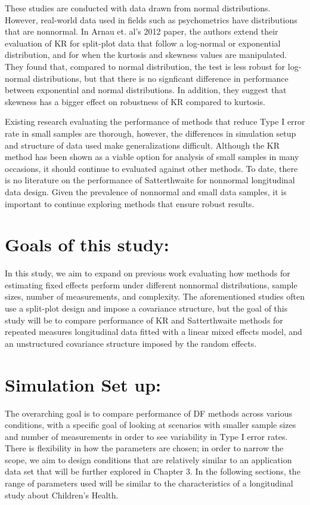 \documentclass[12pt, twoside]{amherstthesis}
\begin{document}
These studies are conducted with data drawn from normal distributions. However, real-world data used in fields such as psychometrics have distributions that are nonnormal. In Arnau et. al's 2012 paper, the authors extend their evaluation of KR for split-plot data that follow a log-normal or exponential distribution, and for when the kurtosis and skewness values are manipulated. They found that, compared to normal distribution, the test is less robust for log-normal distributions, but that there is no signficant difference in performance between exponential and normal distributions. In addition, they suggest that skewness has a bigger effect on robustness of KR compared to kurtosis.

Existing research evaluating the performance of methods that reduce Type I error rate in small samples are thorough, however, the differences in simulation setup and structure of data used make generalizations difficult. Although the KR method has been shown as a viable option for analysis of small samples in many occasions, it should continue to evaluated against other methods. To date, there is no literature on the performance of Satterthwaite for nonnormal longitudinal data design. Given the prevalence of nonnormal and small data samples, it is important to continue exploring methods that ensure robust results.

\hypertarget{goals-of-this-study}{%
\section{Goals of this study:}\label{goals-of-this-study}}

In this study, we aim to expand on previous work evaluating how methods for estimating fixed effects perform under different nonnormal distributions, sample sizes, number of measurements, and complexity. The aforementioned studies often use a split-plot design and impose a covariance structure, but the goal of this study will be to compare performance of KR and Satterthwaite methods for repeated measures longitudinal data fitted with a linear mixed effects model, and an unstructured covariance structure imposed by the random effects.

\hypertarget{simulation-set-up}{%
\section{Simulation Set up:}\label{simulation-set-up}}

The overarching goal is to compare performance of DF methods across various conditions, with a specific goal of looking at scenarios with smaller sample sizes and number of measurements in order to see variability in Type I error rates. There is flexibility in how the parameters are chosen; in order to narrow the scope, we aim to design conditions that are relatively similar to an application data set that will be further explored in Chapter 3. In the following sections, the range of parameters used will be similar to the characteristics of a longitudinal study about Children's Health.
\end{document}
